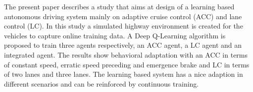 \begin{sloppypar}

The present paper describes a study that aims at design of a learning based autonomous driving system mainly on adaptive cruise control (ACC) and lane control (LC). In this study a simulated highway environment is created for the vehicles to capture online training data. A Deep Q-Learning algorithm is proposed to train three agents respectively, an ACC agent, a LC agent and an integrated agent. The results show behavioral adaptation with an ACC in terms of constant speed, erratic speed preceding and emergence brake and LC in terms of two lanes and three lanes. The learning based system has a nice adaption in different scenarios and can be reinforced by continuous training.

\newpage
\end{sloppypar}
%
%
